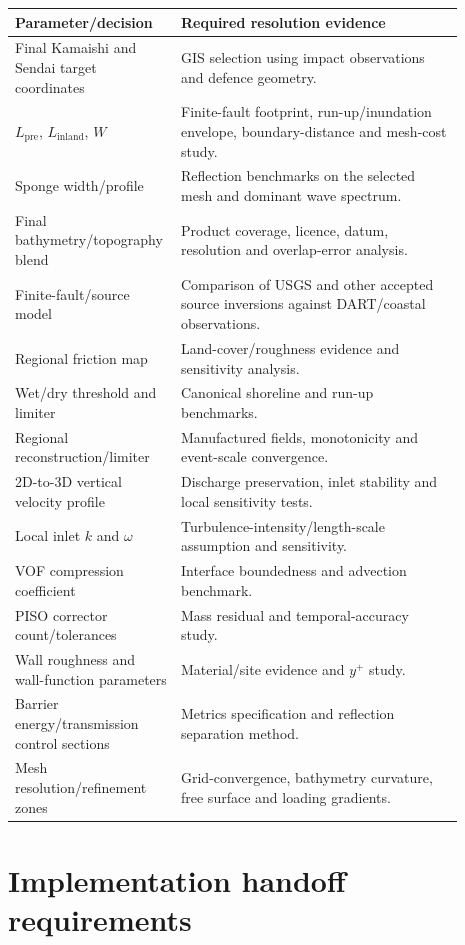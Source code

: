 \documentclass[11pt,a4paper]{article}
\begin{document}
\begin{longtable}{p{0.28\linewidth}p{0.61\linewidth}}
\toprule
Parameter/decision & Required resolution evidence\\
\midrule
Final Kamaishi and Sendai target coordinates & GIS selection using impact observations and defence geometry.\\
$L_{\mathrm{pre}}$, $L_{\mathrm{inland}}$, $W$ & Finite-fault footprint, run-up/inundation envelope, boundary-distance and mesh-cost study.\\
Sponge width/profile & Reflection benchmarks on the selected mesh and dominant wave spectrum.\\
Final bathymetry/topography blend & Product coverage, licence, datum, resolution and overlap-error analysis.\\
Finite-fault/source model & Comparison of USGS and other accepted source inversions against DART/coastal observations.\\
Regional friction map & Land-cover/roughness evidence and sensitivity analysis.\\
Wet/dry threshold and limiter & Canonical shoreline and run-up benchmarks.\\
Regional reconstruction/limiter & Manufactured fields, monotonicity and event-scale convergence.\\
2D-to-3D vertical velocity profile & Discharge preservation, inlet stability and local sensitivity tests.\\
Local inlet $k$ and $\omega$ & Turbulence-intensity/length-scale assumption and sensitivity.\\
VOF compression coefficient & Interface boundedness and advection benchmark.\\
PISO corrector count/tolerances & Mass residual and temporal-accuracy study.\\
Wall roughness and wall-function parameters & Material/site evidence and $y^+$ study.\\
Barrier energy/transmission control sections & Metrics specification and reflection separation method.\\
Mesh resolution/refinement zones & Grid-convergence, bathymetry curvature, free surface and loading gradients.\\
\bottomrule
\end{longtable}

\section{Implementation handoff requirements}
\end{document}
